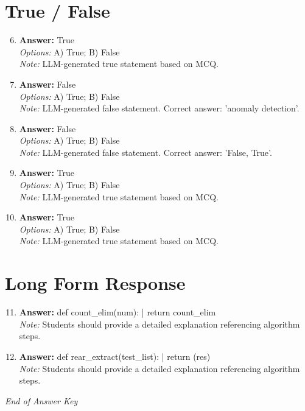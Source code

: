 \documentclass[12pt]{article}
\begin{document}
\section*{True / False}
\begin{enumerate}[label=\arabic*.]
\setcounter{enumi}{5}
\item \textbf{Answer:} True
\\ \textit{Options:} A) True; B) False
\\ \textit{Note:} LLM-generated true statement based on MCQ.
\item \textbf{Answer:} False
\\ \textit{Options:} A) True; B) False
\\ \textit{Note:} LLM-generated false statement. Correct answer: 'anomaly detection'.
\item \textbf{Answer:} False
\\ \textit{Options:} A) True; B) False
\\ \textit{Note:} LLM-generated false statement. Correct answer: 'False, True'.
\item \textbf{Answer:} True
\\ \textit{Options:} A) True; B) False
\\ \textit{Note:} LLM-generated true statement based on MCQ.
\item \textbf{Answer:} True
\\ \textit{Options:} A) True; B) False
\\ \textit{Note:} LLM-generated true statement based on MCQ.
\end{enumerate}

\section*{Long Form Response}
\begin{enumerate}[label=\arabic*.]
\setcounter{enumi}{10}
\item \textbf{Answer:} def count\_elim(num): | return count\_elim
\\ \textit{Note:} Students should provide a detailed explanation referencing algorithm steps.
\item \textbf{Answer:} def rear\_extract(test\_list): | return (res)
\\ \textit{Note:} Students should provide a detailed explanation referencing algorithm steps.
\end{enumerate}

\vfill
\noindent\textit{End of Answer Key}
\end{document}
